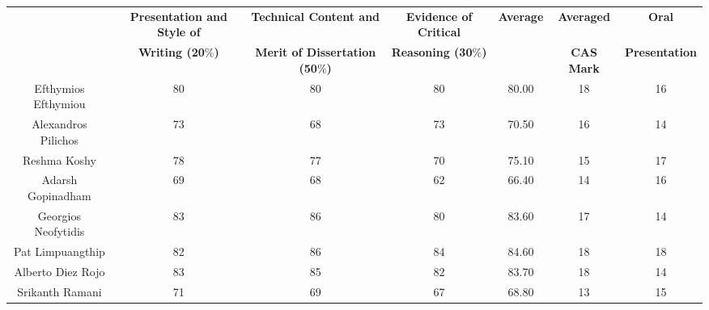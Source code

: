 \documentclass[14pt,twoside]{report}
\begin{document}
{\begin{landscape}
\begin{tabular}{||c| c c c |c| c c||}
\hline\hline
                           & {\bf Presentation and Style of} & {\bf Technical Content and}           & {\bf Evidence of Critical} & {\bf Average} & {\bf Averaged} & {\bf Oral}\\
                           & {\bf Writing (20$\%$)}          & {\bf Merit of Dissertation (50$\%$)}  & {\bf Reasoning (30$\%$)}   &               & {\bf CAS Mark} & {\bf Presentation} \\
\hline
Efthymios Efthymiou        &         80                      &           80                          &          80                &    80.00      &    18          & 16              \\
Alexandros Pilichos        &         73                      &           68                          &          73                &    70.50      &    16          & 14              \\
Reshma Koshy               &         78                      &           77                          &          70                &    75.10      &    15          & 17              \\
Adarsh Gopinadham          &         69                      &           68                          &          62                &    66.40      &    14          & 16              \\
Georgios Neofytidis        &         83                      &           86                          &          80                &    83.60      &    17          & 14              \\
Pat Limpuangthip           &         82                      &           86                          &          84                &    84.60      &    18          & 18              \\
Alberto Diez Rojo          &         83                      &           85                          &          82                &    83.70      &    18          & 14              \\
Srikanth Ramani            &         71                      &           69                          &          67                &    68.80      &    13          & 15              \\
\hline\hline
\end{tabular}
    \end{landscape}
    \clearpage%
}
\end{document}
